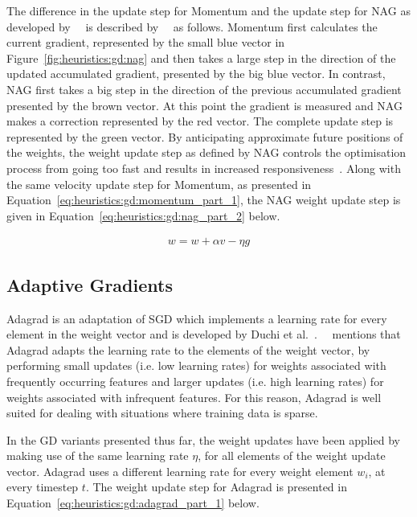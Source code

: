 \noindent
The difference in the update step for \acs{Momentum} and the update step for \acs{NAG} as developed by~\citeauthor{ref:sutskever:2013-2}~\cite{ref:sutskever:2013-2} is described by~\citeauthor{ref:ruder:2016}~\cite{ref:ruder:2016} as follows. \acs{Momentum} first calculates the current gradient, represented by the small blue vector in Figure~\ref{fig:heuristics:gd:nag} and then takes a large step in the direction of the updated accumulated gradient, presented by the big blue vector. In contrast, \acs{NAG} first takes a big step in the direction of the previous accumulated gradient presented by the brown vector. At this point the gradient is measured and \acs{NAG} makes a correction represented by the red vector. The complete update step is represented by the green vector. By anticipating approximate future positions of the weights, the weight update step as defined by \acs{NAG} controls the optimisation process from going too fast and results in increased responsiveness~\cite{ref:bengio:2013}. Along with the same velocity update step for \acs{Momentum}, as presented in Equation~\eqref{eq:heuristics:gd:momentum_part_1}, the \acs{NAG} weight update step is given in Equation~\eqref{eq:heuristics:gd:nag_part_2} below.

\begin{equation}
      \label{eq:heuristics:gd:nag_part_2}
      \begin{split}
            w = w + \alpha v - \eta g
      \end{split}
\end{equation}


\subsection{Adaptive Gradients}\label{sec:heuristics:adagrad}

\Acf{Adagrad} is an adaptation of \acs{SGD} which implements a learning rate for every element in the weight vector and is developed by Duchi et al.~\cite{ref:duchi:2011}.~\citeauthor{ref:ruder:2016}~\cite{ref:ruder:2016} mentions that \acs{Adagrad} adapts the learning rate to the elements of the weight vector, by  performing small updates (i.e. low learning rates) for weights associated with frequently occurring features and larger updates (i.e. high learning rates) for weights associated with infrequent features. For this reason, \acs{Adagrad} is well suited for dealing with situations where training data is sparse.

In the \acs{GD} variants presented thus far, the weight updates have been applied by making use of the same learning rate $\eta$, for all elements of the weight update vector. \Acs{Adagrad} uses a different learning rate for every weight element $w_{i}$, at every timestep $t$. The weight update step for \acs{Adagrad} is presented in Equation~\eqref{eq:heuristics:gd:adagrad_part_1} below.

